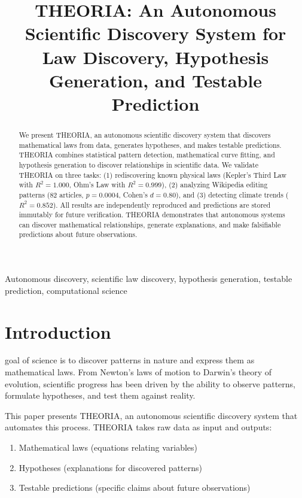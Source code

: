 \documentclass[journal,10pt]{IEEEtran}
\begin{document}
\title{THEORIA: An Autonomous Scientific Discovery System for Law Discovery, Hypothesis Generation, and Testable Prediction}

\author{
}

\maketitle

\begin{abstract}
We present THEORIA, an autonomous scientific discovery system that discovers mathematical laws from data, generates hypotheses, and makes testable predictions. THEORIA combines statistical pattern detection, mathematical curve fitting, and hypothesis generation to discover relationships in scientific data. We validate THEORIA on three tasks: (1) rediscovering known physical laws (Kepler's Third Law with $R^2 = 1.000$, Ohm's Law with $R^2 = 0.999$), (2) analyzing Wikipedia editing patterns (82 articles, $p = 0.0004$, Cohen's $d = 0.80$), and (3) detecting climate trends ($R^2 = 0.852$). All results are independently reproduced and predictions are stored immutably for future verification. THEORIA demonstrates that autonomous systems can discover mathematical relationships, generate explanations, and make falsifiable predictions about future observations.
\end{abstract}

\begin{IEEEkeywords}
Autonomous discovery, scientific law discovery, hypothesis generation, testable prediction, computational science
\end{IEEEkeywords}

\section{Introduction}

 goal of science is to discover patterns in nature and express them as mathematical laws. From Newton's laws of motion to Darwin's theory of evolution, scientific progress has been driven by the ability to observe patterns, formulate hypotheses, and test them against reality.

This paper presents THEORIA, an autonomous scientific discovery system that automates this process. THEORIA takes raw data as input and outputs:
\begin{enumerate}
\item Mathematical laws (equations relating variables)
\item Hypotheses (explanations for discovered patterns)
\item Testable predictions (specific claims about future observations)
\end{enumerate}
\end{document}
